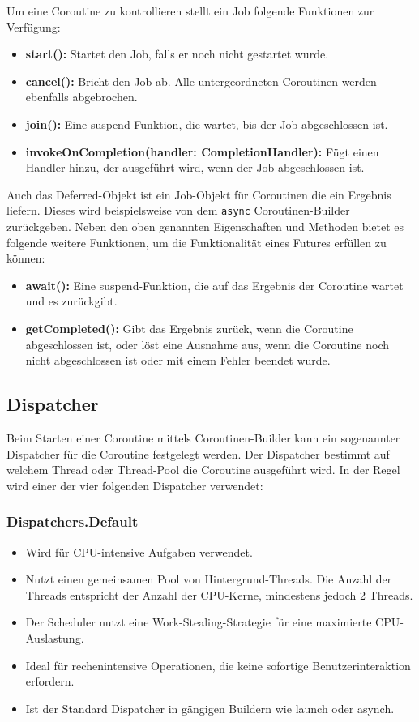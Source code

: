 \documentclass[fontsize=12pt,paper=a4,twoside=semi,parskip=half-,headsepline,headinclude]{scrreprt}
\begin{document}
Um eine Coroutine zu kontrollieren stellt ein Job folgende Funktionen zur Verfügung:

\begin{itemize}
	\item \textbf{start():} Startet den Job, falls er noch nicht gestartet wurde.
	\item \textbf{cancel():} Bricht den Job ab. Alle untergeordneten Coroutinen werden ebenfalls abgebrochen.
	\item \textbf{join():} Eine suspend-Funktion, die wartet, bis der Job abgeschlossen ist.
	\item \textbf{invokeOnCompletion(handler: CompletionHandler):} Fügt einen Handler hinzu, der ausgeführt wird, wenn der Job abgeschlossen ist.
\end{itemize}

Auch das Deferred-Objekt ist ein Job-Objekt für Coroutinen die ein Ergebnis liefern. Dieses wird beispielsweise von dem \texttt{async} Coroutinen-Builder zurückgeben. Neben den oben genannten Eigenschaften und Methoden bietet es folgende weitere Funktionen, um die Funktionalität eines Futures erfüllen zu können:

\begin{itemize}
	\item \textbf{await():} Eine suspend-Funktion, die auf das Ergebnis der Coroutine wartet und es zurückgibt.
	\item \textbf{getCompleted():} Gibt das Ergebnis zurück, wenn die Coroutine abgeschlossen ist, oder löst eine Ausnahme aus, wenn die Coroutine noch nicht abgeschlossen ist oder mit einem Fehler beendet wurde.
\end{itemize}

\subsection{Dispatcher}

Beim Starten einer Coroutine mittels Coroutinen-Builder kann ein sogenannter Dispatcher für die Coroutine festgelegt werden. Der Dispatcher bestimmt auf welchem Thread oder Thread-Pool die Coroutine ausgeführt wird. In der Regel wird einer der vier folgenden Dispatcher verwendet:

\subsubsection{Dispatchers.Default}

\begin{itemize}
	\item Wird für CPU-intensive Aufgaben verwendet.
	\item Nutzt einen gemeinsamen Pool von Hintergrund-Threads. Die Anzahl der Threads entspricht der Anzahl der CPU-Kerne, mindestens jedoch 2 Threads.
	\item Der Scheduler nutzt eine Work-Stealing-Strategie für eine maximierte CPU-Auslastung.
	\item Ideal für rechenintensive Operationen, die keine sofortige Benutzerinteraktion erfordern.
	\item Ist der Standard Dispatcher in gängigen Buildern wie launch oder asynch.
\end{itemize}
\end{document}
